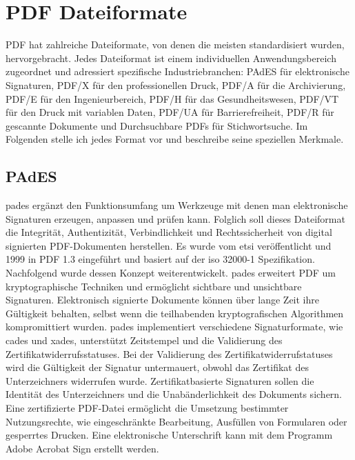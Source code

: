 \section{PDF Dateiformate}
PDF hat zahlreiche Dateiformate, von denen die meisten standardisiert wurden, hervorgebracht. Jedes Dateiformat ist einem individuellen Anwendungsbereich zugeordnet und adressiert spezifische Industriebranchen: PAdES für elektronische Signaturen, PDF/X für den professionellen Druck, PDF/A für die Archivierung, PDF/E für den Ingenieurbereich, PDF/H für das Gesundheitswesen, PDF/VT für den Druck mit variablen Daten, PDF/UA für Barrierefreiheit, PDF/R für gescannte Dokumente und Durchsuchbare PDFs für Stichwortsuche. Im Folgenden stelle ich jedes Format vor und beschreibe seine speziellen Merkmale. 

\subsection{PAdES}
\gls{pades} ergänzt den Funktionsumfang um Werkzeuge mit denen man elektronische Signaturen erzeugen, anpassen und prüfen kann. Folglich soll dieses Dateiformat die Integrität, Authentizität, Verbindlichkeit und Rechtssicherheit von digital signierten PDF-Dokumenten herstellen. Es wurde vom \gls{etsi} veröffentlicht und 1999 in PDF 1.3 eingeführt und basiert auf der \gls{iso} 32000-1 Spezifikation.  Nachfolgend wurde dessen Konzept weiterentwickelt. \gls{pades} erweitert PDF um kryptographische Techniken und ermöglicht sichtbare und unsichtbare Signaturen. Elektronisch signierte Dokumente können über lange Zeit ihre Gültigkeit behalten, selbst wenn die teilhabenden kryptografischen Algorithmen kompromittiert wurden. \gls{pades} implementiert verschiedene Signaturformate, wie \gls{cades} und \gls{xades}, unterstützt Zeitstempel und die Validierung des Zertifikatwiderrufsstatuses. Bei der Validierung des Zertifikatwiderrufstatuses wird die Gültigkeit der Signatur untermauert, obwohl das Zertifikat des Unterzeichners widerrufen wurde. Zertifikatbasierte Signaturen sollen die Identität des Unterzeichners und die Unabänderlichkeit des Dokuments sichern. Eine zertifizierte PDF-Datei ermöglicht die Umsetzung bestimmter Nutzungsrechte, wie eingeschränkte Bearbeitung, Ausfüllen von Formularen oder gesperrtes Drucken. Eine elektronische Unterschrift kann mit dem Programm Adobe Acrobat Sign erstellt werden. \cite{adobe-pdf-pades}


